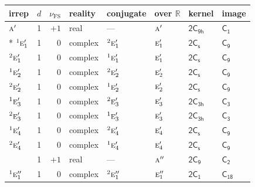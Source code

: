 \documentclass[10pt,a4paper]{article}
\numberwithin{equation}{section}
\newcommand{\grp}[1]{\mathsf{#1}}
\newcommand{\irr}[1]{\text{\normalfont\scshape #1}}
\newcommand{\conjpair}[1]{{}^{#1}}
\newcommand{\detbox}[1]{{\setlength{\fboxsep}{1pt}\fbox{#1}}}
\newcommand{\fsind}{\nu_{\mathrm{FS}}}
\begin{document}
{\small\renewcommand{\arraystretch}{1.25}\setlength{\tabcolsep}{4pt}\begin{longtable}{@{}lrrlllll@{}}\toprule
irrep & $d$ & $\fsind$ & reality & conjugate & over $\mathbb{R}$ & kernel & image\\\midrule\endhead
\bottomrule\endfoot\endlastfoot
$\irr{a}'$ & 1 & $+1$ & real & --- & $\irr{a}'$ & \href{2C9h.pdf}{$\grp{2C_{9h}}$} & \href{../../../rotation/data/pdf/C1.pdf}{$\grp{C_{1}}$}\\*
$\conjpair{1}\irr{e}_{1}'$ & 1 & $0$ & complex & $\conjpair{2}\irr{e}_{1}'$ & $\irr{e}_{1}'$ & \href{2C1v.pdf}{$\grp{2C_{s}}$} & \href{../../../rotation/data/pdf/C9.pdf}{$\grp{C_{9}}$}\\
$\conjpair{2}\irr{e}_{1}'$ & 1 & $0$ & complex & $\conjpair{1}\irr{e}_{1}'$ & $\irr{e}_{1}'$ & \href{2C1v.pdf}{$\grp{2C_{s}}$} & \href{../../../rotation/data/pdf/C9.pdf}{$\grp{C_{9}}$}\\
$\conjpair{1}\irr{e}_{2}'$ & 1 & $0$ & complex & $\conjpair{2}\irr{e}_{2}'$ & $\irr{e}_{2}'$ & \href{2C1v.pdf}{$\grp{2C_{s}}$} & \href{../../../rotation/data/pdf/C9.pdf}{$\grp{C_{9}}$}\\
$\conjpair{2}\irr{e}_{2}'$ & 1 & $0$ & complex & $\conjpair{1}\irr{e}_{2}'$ & $\irr{e}_{2}'$ & \href{2C1v.pdf}{$\grp{2C_{s}}$} & \href{../../../rotation/data/pdf/C9.pdf}{$\grp{C_{9}}$}\\
$\conjpair{1}\irr{e}_{3}'$ & 1 & $0$ & complex & $\conjpair{2}\irr{e}_{3}'$ & $\irr{e}_{3}'$ & \href{2C3h.pdf}{$\grp{2C_{3h}}$} & \href{../../../rotation/data/pdf/C3.pdf}{$\grp{C_{3}}$}\\
$\conjpair{2}\irr{e}_{3}'$ & 1 & $0$ & complex & $\conjpair{1}\irr{e}_{3}'$ & $\irr{e}_{3}'$ & \href{2C3h.pdf}{$\grp{2C_{3h}}$} & \href{../../../rotation/data/pdf/C3.pdf}{$\grp{C_{3}}$}\\
$\conjpair{1}\irr{e}_{4}'$ & 1 & $0$ & complex & $\conjpair{2}\irr{e}_{4}'$ & $\irr{e}_{4}'$ & \href{2C1v.pdf}{$\grp{2C_{s}}$} & \href{../../../rotation/data/pdf/C9.pdf}{$\grp{C_{9}}$}\\
$\conjpair{2}\irr{e}_{4}'$ & 1 & $0$ & complex & $\conjpair{1}\irr{e}_{4}'$ & $\irr{e}_{4}'$ & \href{2C1v.pdf}{$\grp{2C_{s}}$} & \href{../../../rotation/data/pdf/C9.pdf}{$\grp{C_{9}}$}\\
\detbox{$\irr{a}''$} & 1 & $+1$ & real & --- & $\irr{a}''$ & \href{2C9.pdf}{$\grp{2C_{9}}$} & \href{../../../rotation/data/pdf/C2.pdf}{$\grp{C_{2}}$}\\
$\conjpair{1}\irr{e}_{1}''$ & 1 & $0$ & complex & $\conjpair{2}\irr{e}_{1}''$ & $\irr{e}_{1}''$ & \href{2C1.pdf}{$\grp{2C_{1}}$} & $\grp{C_{18}}$\\

\end{longtable}}
\end{document}
